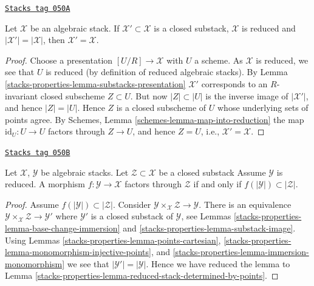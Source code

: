 \begin{lemma}
\label{stacks-properties-lemma-reduced-stack-determined-by-points}
\href{https://stacks.math.columbia.edu/tag/050A}{\texttt{Stacks tag 050A}}

Let $\mathcal{X}$ be an algebraic stack.
If $\mathcal{X}' \subset \mathcal{X}$
is a closed substack, $\mathcal{X}$ is reduced and
$|\mathcal{X}'| = |\mathcal{X}|$, then $\mathcal{X}' = \mathcal{X}$.
\end{lemma}

\begin{proof}
Choose a presentation $[U/R] \to \mathcal{X}$ with $U$ a scheme.
As $\mathcal{X}$ is reduced, we see that $U$ is reduced (by definition
of reduced algebraic stacks). By
Lemma \ref{stacks-properties-lemma-substacks-presentation}
$\mathcal{X}'$ corresponds to an $R$-invariant closed subscheme $Z \subset U$.
But now $|Z| \subset |U|$ is the inverse image of $|\mathcal{X}'|$, and
hence $|Z| = |U|$. Hence $Z$ is a closed subscheme of $U$ whose underlying
sets of points agree. By
Schemes, Lemma \ref{schemes-lemma-map-into-reduction}
the map $\text{id}_U : U \to U$ factors through $Z \to U$, and hence
$Z = U$, i.e., $\mathcal{X}' = \mathcal{X}$.
\end{proof}

\begin{lemma}
\label{stacks-properties-lemma-map-into-reduction}
\href{https://stacks.math.columbia.edu/tag/050B}{\texttt{Stacks tag 050B}}

Let $\mathcal{X}$, $\mathcal{Y}$ be algebraic stacks.
Let $\mathcal{Z} \subset \mathcal{X}$ be a closed substack
Assume $\mathcal{Y}$ is reduced.
A morphism $f : \mathcal{Y} \to \mathcal{X}$ factors through
$\mathcal{Z}$ if and only if
$f(|\mathcal{Y}|) \subset |\mathcal{Z}|$.
\end{lemma}

\begin{proof}
Assume $f(|\mathcal{Y}|) \subset |\mathcal{Z}|$. Consider
$\mathcal{Y} \times_\mathcal{X} \mathcal{Z} \to \mathcal{Y}$.
There is an equivalence
$\mathcal{Y} \times_\mathcal{X} \mathcal{Z} \to \mathcal{Y}'$
where $\mathcal{Y}'$ is a closed substack of $\mathcal{Y}$, see
Lemmas \ref{stacks-properties-lemma-base-change-immersion} and
\ref{stacks-properties-lemma-substack-image}.
Using
Lemmas \ref{stacks-properties-lemma-points-cartesian},
\ref{stacks-properties-lemma-monomorphism-injective-points}, and
\ref{stacks-properties-lemma-immersion-monomorphism}
we see that $|\mathcal{Y}'| = |\mathcal{Y}|$. Hence we have
reduced the lemma to
Lemma \ref{stacks-properties-lemma-reduced-stack-determined-by-points}.
\end{proof}

